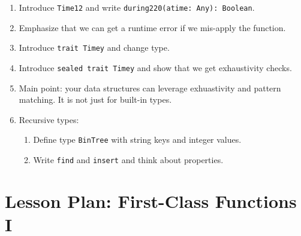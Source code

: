 \documentclass[9pt]{extbook}
\begin{document}
\begin{enumerate}
  \item Introduce \lstinline|Time12| and write \lstinline|during220(atime: Any): Boolean|.

  \item Emphasize that we can get a runtime error if we mis-apply the function.

  \item Introduce \lstinline|trait Timey| and change type.

  \item Introduce \lstinline|sealed trait Timey| and show that we get exhaustivity checks.

  \item Main point: your data structures can leverage
  exhuastivity and pattern matching. It is not just for built-in
  types.

  \item Recursive types:

  \begin{enumerate}

  \item Define type \lstinline|BinTree| with string keys and integer values.

  \item Write \lstinline|find| and \lstinline|insert| and think about properties.

  \end{enumerate}
 
\end{enumerate}

\chapter{Lesson Plan: First-Class Functions I}
\end{document}
